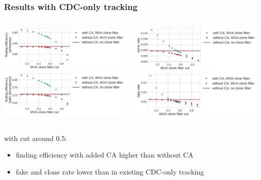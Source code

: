 \documentclass[18pt, aspectratio=169]{beamer}
\begin{document}
\begin{frame}
  \frametitle{Results with CDC-only tracking}
  \begin{columns}
    \begin{column}{0.5\textwidth}
      \centering
      \includegraphics[width=1.0\textwidth]{figures/ca_is_matched_primaries.pdf}\\
      \includegraphics[width=1.0\textwidth]{figures/ca_is_matched_with_secondaries.pdf}
    \end{column}
    \begin{column}{0.5\textwidth}
      \centering
      \includegraphics[width=1.0\textwidth]{figures/ca_clone_rate.pdf}\\
      \includegraphics[width=1.0\textwidth]{figures/ca_fake_rate.pdf}
    \end{column}
  \end{columns}
  with cut around 0.5:
  \begin{itemize}
  \item finding efficiency with added CA higher than without CA
  \item fake and clone rate lower than in existing CDC-only tracking
  \end{itemize}
\end{frame}
\end{document}
